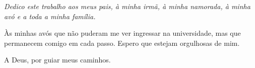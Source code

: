 \begin{dedicatoria}
\vspace*{\fill}
\noindent\hfill
\begin{minipage}{0.8\textwidth}
\begin{SingleSpace}
\begin{flushright}
\itshape
Dedico este trabalho aos meus pais, à minha irmã, à minha namorada, à minha avó e a toda a minha família.

Às minhas avós que não puderam me ver ingressar na universidade, mas que permanecem comigo em cada passo. Espero que estejam orgulhosas de mim.

A Deus, por guiar meus caminhos.
\end{flushright}
\end{SingleSpace}
\end{minipage}
\end{dedicatoria}

